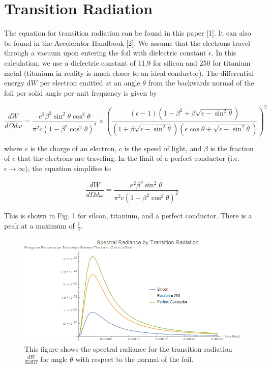 \documentclass[12pt]{article}
\begin{document}
\section{Transition Radiation}

The equation for transition radiation can be found in this paper [1]. It can also be found in the Accelerator Handbook [2]. We assume that the electrons travel through a vacuum upon entering the foil with dielectric constant $\epsilon$. In this calculation, we use a dielectric constant of 11.9 for silicon and 250 for titanium metal (titanium in reality is much closer to an ideal conductor). The differential energy d$W$ per electron emitted at an angle $\theta$ from the backwards normal of the foil per solid angle per unit frequency is given by

\begin{equation}
\frac{dW} {d \Omega d \omega} =\frac{e^{2} \beta^{2} \sin^2 \theta \cos^2 \theta} {\pi^{2} c (1-\beta^{2} \cos^2 \theta)^{2}} \times (\frac{(\epsilon -1) (1-\beta^{2}+\beta \sqrt{\epsilon-\sin^2 \theta})} {(1+\beta \sqrt{\epsilon-\sin^2 \theta}) (\epsilon \cos \theta + \sqrt{\epsilon- \sin^2 \theta})})^{2}
\end{equation}

where $e$ is the charge of an electron, $c$ is the speed of light, and $\beta$ is the fraction of $c$ that the electrons are traveling. In the limit of a perfect conductor (i.e. $\epsilon \rightarrow \infty$), the equation simplifies to

\begin{equation}
\frac{dW} {d \Omega d \omega} =\frac{e^{2} \beta^{2} \sin^2 \theta} {\pi^{2} c (1-\beta^{2} \cos^2 \theta)^{2}}
\end{equation}

This is shown in Fig. 1 for silcon, titanium, and a perfect conductor. There is a peak at a maximum of $\frac{1}{\gamma}$.

\begin{figure}
\begin{center}
\includegraphics[scale=0.5]{dWdomega.PNG}
\caption{This figure shows the spectral radiance for the transition radiation $\frac{\mathrm{d}W}{\mathrm{d} \omega \mathrm{d} \Omega}$ for angle $\theta$ with respect to the normal of the foil.}
\end{center}
\end{figure}
\end{document}
